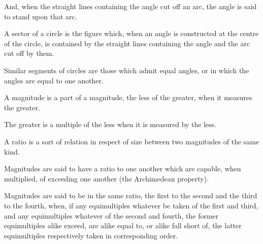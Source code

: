 \begin{scope}
\label{def:III.9}
And, when the straight lines containing the angle cut off an arc, the
angle is said to stand upon that arc.
\end{scope}

\begin{scope}
\label{def:III.10}
A sector of a circle is the figure which, when an angle is constructed
at the centre of the circle, is contained by the straight lines
containing the angle and the arc cut off by them.
\end{scope}

\begin{scope}
\label{def:III.11}
Similar segments of circles are those which admit equal angles, or in
which the angles are equal to one another.
\end{scope}


\begin{scope}
\label{def:V.1}
A magnitude is a part of a magnitude, the less of the greater, when
it measures the greater.
\end{scope}

\begin{scope}
\label{def:V.2}
The greater is a multiple of the less when it is measured by the less.
\end{scope}

\begin{scope}
\label{def:V.3}
A ratio is a sort of relation in respect of size between two
magnitudes of the same kind.
\end{scope}

\begin{scope}
\label{def:V.4}
Magnitudes are said to have a ratio to one another which are capable,
when multiplied, of exceeding one another (the Archimedean property).
\end{scope}

\begin{scope}
\label{def:V.5}
Magnitudes are said to be in the same ratio, the first to the second
and the third to the fourth, when, if any equimultiples whatever be
taken of the first and third, and any equimultiples whatever of the
second and fourth, the former equimultiples alike exceed, are alike
equal to, or alike fall short of, the latter equimultiples respectively
taken in corresponding order.
\end{scope}

